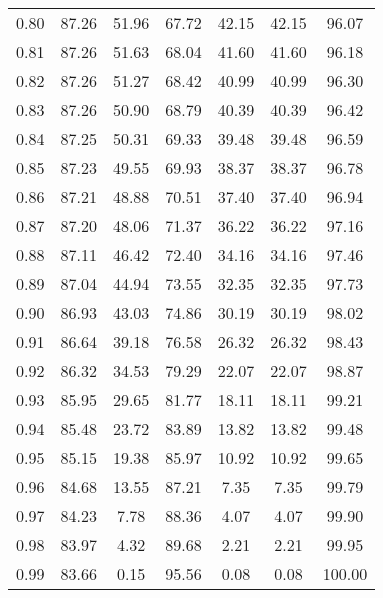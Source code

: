 \begin{tabular}{|c|c|c|c|c|c|c|}
      0.80 &     87.26 &     51.96 &      67.72 &   42.15 &      42.15 &         96.07 \\
      0.81 &     87.26 &     51.63 &      68.04 &   41.60 &      41.60 &         96.18 \\
      0.82 &     87.26 &     51.27 &      68.42 &   40.99 &      40.99 &         96.30 \\
      0.83 &     87.26 &     50.90 &      68.79 &   40.39 &      40.39 &         96.42 \\
      0.84 &     87.25 &     50.31 &      69.33 &   39.48 &      39.48 &         96.59 \\
      0.85 &     87.23 &     49.55 &      69.93 &   38.37 &      38.37 &         96.78 \\
      0.86 &     87.21 &     48.88 &      70.51 &   37.40 &      37.40 &         96.94 \\
      0.87 &     87.20 &     48.06 &      71.37 &   36.22 &      36.22 &         97.16 \\
      0.88 &     87.11 &     46.42 &      72.40 &   34.16 &      34.16 &         97.46 \\
      0.89 &     87.04 &     44.94 &      73.55 &   32.35 &      32.35 &         97.73 \\
      0.90 &     86.93 &     43.03 &      74.86 &   30.19 &      30.19 &         98.02 \\
      0.91 &     86.64 &     39.18 &      76.58 &   26.32 &      26.32 &         98.43 \\
      0.92 &     86.32 &     34.53 &      79.29 &   22.07 &      22.07 &         98.87 \\
      0.93 &     85.95 &     29.65 &      81.77 &   18.11 &      18.11 &         99.21 \\
      0.94 &     85.48 &     23.72 &      83.89 &   13.82 &      13.82 &         99.48 \\
      0.95 &     85.15 &     19.38 &      85.97 &   10.92 &      10.92 &         99.65 \\
      0.96 &     84.68 &     13.55 &      87.21 &    7.35 &       7.35 &         99.79 \\
      0.97 &     84.23 &      7.78 &      88.36 &    4.07 &       4.07 &         99.90 \\
      0.98 &     83.97 &      4.32 &      89.68 &    2.21 &       2.21 &         99.95 \\
      0.99 &     83.66 &      0.15 &      95.56 &    0.08 &       0.08 &        100.00 \\
\bottomrule
\end{tabular}
